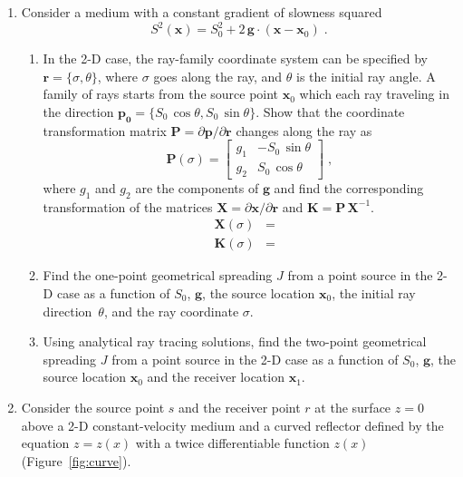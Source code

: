 \begin{enumerate}
\item Consider a medium with a constant gradient of slowness squared
  \begin{equation}
    S^2(\mathbf{x}) = S_0^2 + 2\,\mathbf{g} \cdot (\mathbf{x}-\mathbf{x}_0)\;.
  \end{equation}
\begin{enumerate}
\item In the 2-D case, the ray-family coordinate system can be
  specified by $\mathbf{r}=\{\sigma,\theta\}$, where $\sigma$ goes
  along the ray, and $\theta$ is the initial ray angle. A family of
  rays starts from the source point $\mathbf{x}_0$ which each ray
  traveling in the direction $\mathbf{p_0} =
  \{S_0\,\cos{\theta},S_0\,\sin{\theta}\}$. Show that the coordinate
  transformation matrix $\mathbf{P}=\partial \mathbf{p}/\partial
  \mathbf{r}$ changes along the ray as
  \begin{equation}
    \label{eq:p}
    \mathbf{P}(\sigma) = \left[\begin{array}{cc} 
        g_1 & -S_0\,\sin{\theta} \\
        g_2 & S_0\,\cos{\theta} \end{array}\right]\;,
  \end{equation}
  where $g_1$ and $g_2$ are the components of $\mathbf{g}$ and find
  the corresponding transformation of the matrices
  $\mathbf{X}=\partial \mathbf{x}/\partial \mathbf{r}$ and
  $\mathbf{K}=\mathbf{P}\,\mathbf{X}^{-1}$.
  \begin{eqnarray}
    \label{eq:x}
    \mathbf{X}(\sigma)  & = & \\ 
    \mathbf{K}(\sigma)  & = & 
    \label{eq:k}
    \end{eqnarray}

  \item Find the one-point geometrical spreading $J$ from a point
    source in the 2-D case as a function of $S_0$, $\mathbf{g}$, the
    source location $\mathbf{x}_0$, the initial ray
    direction~$\theta$, and the ray coordinate $\sigma$.

  \item Using analytical ray tracing solutions, find the two-point
    geometrical spreading $J$ from a point source in the 2-D case as a
    function of $S_0$, $\mathbf{g}$, the source location
    $\mathbf{x}_0$ and the receiver location $\mathbf{x}_1$.

  \end{enumerate}

\item Consider the source point $s$ and the receiver point $r$ at the
  surface $z=0$ above a 2-D constant-velocity medium and a curved
  reflector defined by the equation $z = z(x)$ with a twice
  differentiable function $z(x)$ (Figure~\ref{fig:curve}).


\end{enumerate}
